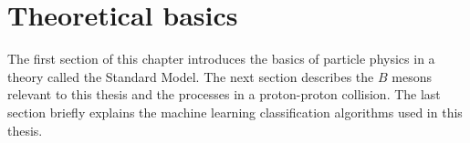 \chapter{Theoretical basics}

The first section of this chapter introduces the basics of particle physics in a theory called the Standard Model.
The next section describes the $B$ mesons relevant to this thesis and the processes in a proton-proton collision.
The last section briefly explains the machine learning classification algorithms used in this thesis.




